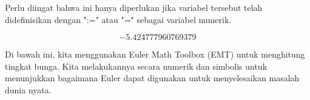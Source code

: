 \documentclass[12pt,arial,letterpaper]{book}
\begin{document}
\begin{eulercomment}
\begin{eulercomment}
\begin{eulercomment}
\begin{eulercomment}
\begin{eulercomment}
\begin{eulercomment}
\begin{eulercomment}
\begin{eulercomment}
\begin{eulercomment}
Perlu diingat bahwa ini hanya diperlukan jika variabel tersebut telah
didefinisikan dengan ":=" atau "=" sebagai variabel numerik.
\end{eulercomment}
\begin{eulerformula}
\[
-5.424777960769379
\]
\end{eulerformula}
\begin{eulercomment}
\begin{eulercomment}
\begin{eulercomment}
Di bawah ini, kita menggunakan Euler Math Toolbox (EMT) untuk
menghitung tingkat bunga. Kita melakukannya secara numerik dan
simbolis untuk menunjukkan bagaimana Euler dapat digunakan untuk
menyelesaikan masalah dunia nyata.


\end{eulercomment}
\end{eulercomment}
\end{eulercomment}
\end{eulercomment}
\end{eulercomment}
\end{eulercomment}
\end{eulercomment}
\end{eulercomment}
\end{eulercomment}
\end{eulercomment}
\end{eulercomment}
\end{document}
